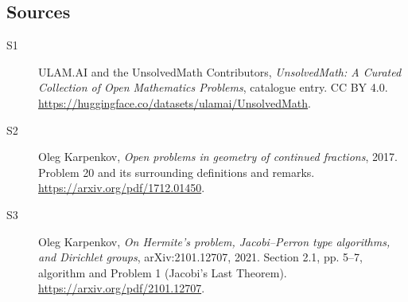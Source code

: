 \documentclass[11pt]{book}
\begin{document}
\subsection{Sources}
\begin{description}
\item[\hypertarget{source:statement:1}{S1}] ULAM.AI and the UnsolvedMath Contributors, \emph{UnsolvedMath: A Curated Collection of Open Mathematics Problems}, catalogue entry. CC BY 4.0. \url{https://huggingface.co/datasets/ulamai/UnsolvedMath}.
\item[\hypertarget{source:statement:2}{S2}] Oleg Karpenkov, \emph{Open problems in geometry of continued fractions}, 2017. Problem 20 and its surrounding definitions and remarks. \url{https://arxiv.org/pdf/1712.01450}.
\item[\hypertarget{source:statement:3}{S3}] Oleg Karpenkov, \emph{On Hermite's problem, Jacobi--Perron type algorithms, and Dirichlet groups}, arXiv:2101.12707, 2021. Section 2.1, pp. 5--7, algorithm and Problem 1 (Jacobi's Last Theorem). \url{https://arxiv.org/pdf/2101.12707}.
\end{description}
\label{end:statement}
\end{document}
